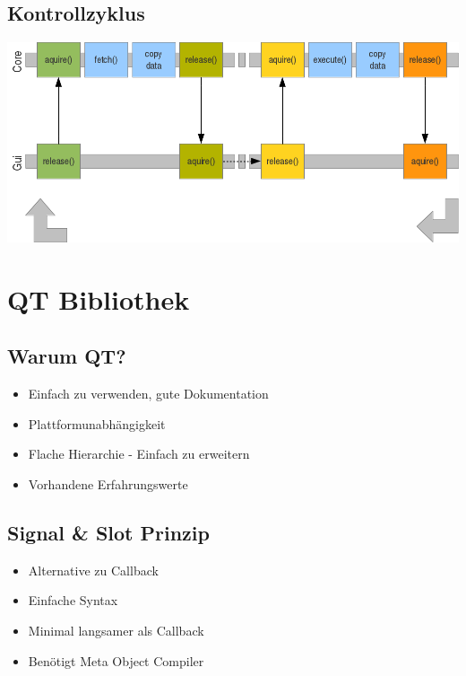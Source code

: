 \subsection{Kontrollzyklus}
\begin{frame}{\insertsubsection}
    \includegraphics[width=\textwidth]{g2}
\end{frame}

\section{QT Bibliothek}

\subsection{Warum QT?}

\begin{frame}{\insertsubsection}
    \begin{itemize}
         \item Einfach zu verwenden, gute Dokumentation
         \item Plattformunabhängigkeit
         \item Flache Hierarchie - Einfach zu erweitern
         \item Vorhandene Erfahrungswerte
    \end{itemize}
\end{frame}

\subsection{Signal \& Slot Prinzip}

\begin{frame}{\insertsubsection}
    \begin{itemize}
         \item Alternative zu Callback
         \item Einfache Syntax
         \item Minimal langsamer als Callback
         \item Benötigt Meta Object Compiler
    \end{itemize}
\end{frame}

